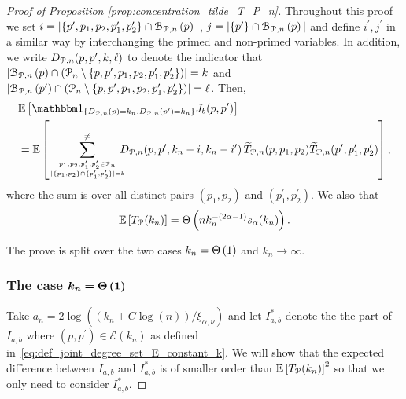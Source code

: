 \begin{proof}[Proof of Proposition \ref{prop:concentration_tilde_T_P_n}]

Throughout this proof we set $i = |\{p^\prime, p_1, p_2, p_1^\prime, p_2^\prime\} \cap {\mathcal B}_{{\mathcal P},n}\left(p\right)|$, $j = |\{p^\prime\} \cap {\mathcal B}_{{\mathcal P},n}\left(p\right)|$ and define $i^\prime, j^\prime$ in a similar way by interchanging the primed and non-primed variables. In addition, we write $D_{{\mathcal P},n}(p,p^\prime,k,\ell)$ to denote the indicator that $|{\mathcal B}_{{\mathcal P},n}\left(p\right) \cap ({\mathcal P}_n \setminus \{p, p^\prime, p_1, p_2, p_1^\prime, p_2^\prime\})| = k$ and $|{\mathcal B}_{{\mathcal P},n}\left(p^\prime\right) \cap ({\mathcal P}_n \setminus \{p, p^\prime, p_1, p_2, p_1^\prime, p_2^\prime\})| = \ell$. Then, 
\begin{align*}
	&\Exp{\ind{D_{\Pcal,n}(p) = k_n, D_{\Pcal,n}(p^\prime) = k_n} J_b(p,p^\prime)}\\
	&= \Exp{\sum_{p_1, p_2, p_1^\prime, p_2^\prime \in \Pcal_n 
		\atop |\{p_1, p_2\} \cap \{p_1^\prime, p_2^\prime\}| = b}^{\ne}
			\hspace{-7pt} D_{\Pcal,n}(p,p^\prime, k_n-i,k_n- i^\prime) \,
			\widetilde{T}_{\Pcal,n}(p,p_1,p_2) \widetilde{T}_{\Pcal,n}(p^\prime, p_1^\prime, p_2^\prime)},
\end{align*}
where the sum is over all distinct pairs $(p_1, p_2)$ and $(p_1^\prime, p_2^\prime)$. We also that 
\[
	\mathbb{E}\left[T_{{\mathcal P}}(k_n)\right] = \Theta\left(n k_n^{-(2\alpha - 1)} s_\alpha(k_n)\right).
\]


The prove is split over the two cases $k_n = \Theta\left(1\right)$ and $k_n \to \infty$. 

\subsubsection*{The case $\bm{k_n = \Theta\left(1\right)}$}

Take $a_n = 2\log\left((k_n + C\log(n))/\xi_{\alpha, \nu}\right)$ and let $I_{a,b}^\ast$ denote the the part of $I_{a,b}$ where $(p,p^\prime) \in \mathcal{E}(k_n)$ as defined in~\eqref{eq:def_joint_degree_set_E_constant_k}. We will show that the expected difference between $I_{a,b}$ and $I_{a,b}^\ast$ is of smaller order than $\mathbb{E}\left[T_{{\mathcal P}}(k_n)\right]^2$ so that we only need to consider $I_{a,b}^\ast$. 


\end{proof}
